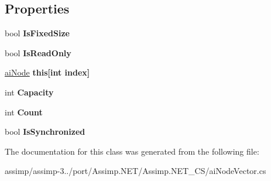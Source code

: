 \subsection*{Properties}
\begin{DoxyCompactItemize}
\item 
\hypertarget{classai_node_vector_aeba2ae4bb040562dd623e6e1d6fff39f}{bool {\bfseries Is\+Fixed\+Size}}\label{classai_node_vector_aeba2ae4bb040562dd623e6e1d6fff39f}

\item 
\hypertarget{classai_node_vector_ac8c64fce3d8a815a691117189740d890}{bool {\bfseries Is\+Read\+Only}}\label{classai_node_vector_ac8c64fce3d8a815a691117189740d890}

\item 
\hypertarget{classai_node_vector_a22bfdb0776133951616aa30456d48dbe}{\hyperlink{structai_node}{ai\+Node} {\bfseries this\mbox{[}int index\mbox{]}}}\label{classai_node_vector_a22bfdb0776133951616aa30456d48dbe}

\item 
\hypertarget{classai_node_vector_af88be22d916c2fd59c5fa2a192918d98}{int {\bfseries Capacity}}\label{classai_node_vector_af88be22d916c2fd59c5fa2a192918d98}

\item 
\hypertarget{classai_node_vector_acde1a2f3b1af924ca1cac134e3bfc20d}{int {\bfseries Count}}\label{classai_node_vector_acde1a2f3b1af924ca1cac134e3bfc20d}

\item 
\hypertarget{classai_node_vector_a41df6c492d639d1708a386454e8598d8}{bool {\bfseries Is\+Synchronized}}\label{classai_node_vector_a41df6c492d639d1708a386454e8598d8}

\end{DoxyCompactItemize}


The documentation for this class was generated from the following file\+:\begin{DoxyCompactItemize}
\item 
assimp/assimp-\/3../port/\+Assimp.\+N\+E\+T/\+Assimp.\+N\+E\+T\+\_\+\+C\+S/ai\+Node\+Vector.\+cs\end{DoxyCompactItemize}
